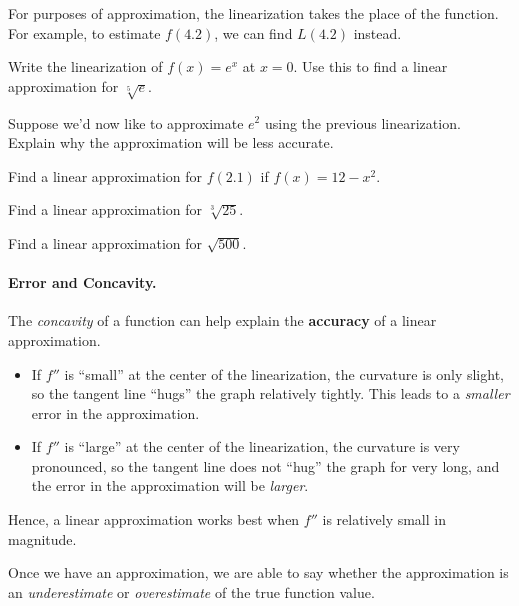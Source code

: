 \documentclass[12pt]{article}
\begin{document}
\vspace{3mm}

For purposes of approximation, the linearization takes the place of the function. For example, to estimate $f(4.2)$, we can find $L(4.2)$ instead.

\vspace{3mm}

\Example Write the linearization of $f(x)=e^x$ at $x=0$. Use this to find a linear approximation for $\sqrt[5]{e}$.

\newpage

\ExampleCont Suppose we'd now like to approximate $e^2$ using the previous linearization. Explain why the approximation will be less accurate.

\vspace{35mm}

\Example Find a linear approximation for $f(2.1)$ if $f(x)=12-x^2$.

\vspace{50mm}

\Example Find a linear approximation for $\sqrt[3]{25}$.

\vspace{50mm}

\Example Find a linear approximation for $\sqrt{500}$.

\newpage

\paragraph{Error and Concavity.} The \textit{concavity} of a function can help explain the \textbf{accuracy} of a linear approximation.
\begin{itemize}
\item If $f''$ is ``small'' at the center of the linearization, the curvature is only slight, so the tangent line ``hugs'' the graph relatively tightly. This leads to a \textit{smaller} error in the approximation.
\item If $f''$ is ``large'' at the center of the linearization, the curvature is very pronounced, so the tangent line does not ``hug'' the graph for very long, and the error in the approximation will be \textit{larger}.
\end{itemize}

Hence, a linear approximation works best when $f''$ is relatively small in magnitude.

\vspace{5mm} 

Once we have an approximation, we are able to say whether the approximation is an \textit{underestimate} or \textit{overestimate} of the true function value.
\end{document}
